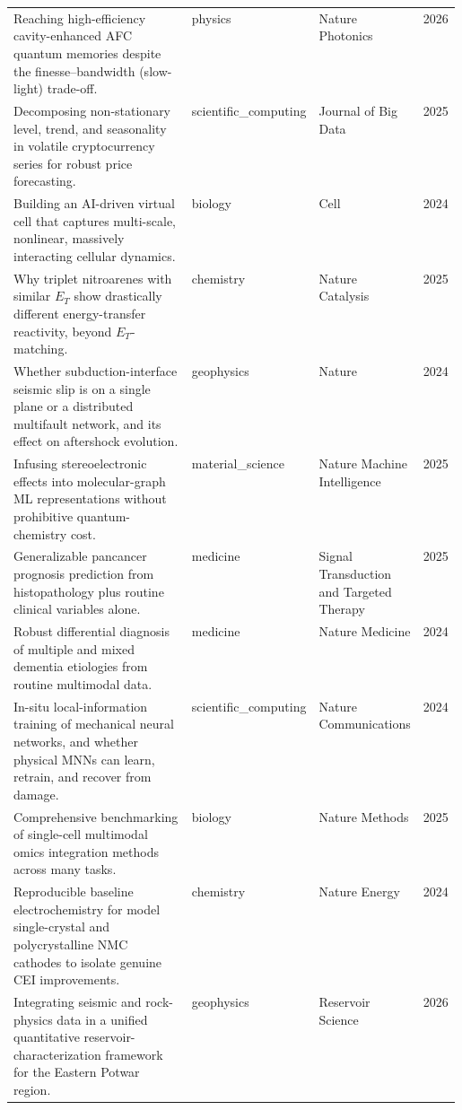 \begin{landscape}
\begin{longtable}{@{}p{0.58\linewidth} l l c@{}}
\addlinespace
Reaching high-efficiency cavity-enhanced AFC quantum memories despite the finesse--bandwidth (slow-light) trade-off. & physics & Nature Photonics & 2026 \\
\addlinespace
Decomposing non-stationary level, trend, and seasonality in volatile cryptocurrency series for robust price forecasting. & scientific\_computing & Journal of Big Data & 2025 \\
\addlinespace
Building an AI-driven virtual cell that captures multi-scale, nonlinear, massively interacting cellular dynamics. & biology & Cell & 2024 \\
\addlinespace
Why triplet nitroarenes with similar $E_T$ show drastically different energy-transfer reactivity, beyond $E_T$-matching. & chemistry & Nature Catalysis & 2025 \\
\addlinespace
Whether subduction-interface seismic slip is on a single plane or a distributed multifault network, and its effect on aftershock evolution. & geophysics & Nature & 2024 \\
\addlinespace
Infusing stereoelectronic effects into molecular-graph ML representations without prohibitive quantum-chemistry cost. & material\_science & Nature Machine Intelligence & 2025 \\
\addlinespace
Generalizable pancancer prognosis prediction from histopathology plus routine clinical variables alone. & medicine & Signal Transduction and Targeted Therapy & 2025 \\
\addlinespace
Robust differential diagnosis of multiple and mixed dementia etiologies from routine multimodal data. & medicine & Nature Medicine & 2024 \\
\addlinespace
In-situ local-information training of mechanical neural networks, and whether physical MNNs can learn, retrain, and recover from damage. & scientific\_computing & Nature Communications & 2024 \\
\addlinespace
Comprehensive benchmarking of single-cell multimodal omics integration methods across many tasks. & biology & Nature Methods & 2025 \\
\addlinespace
Reproducible baseline electrochemistry for model single-crystal and polycrystalline NMC cathodes to isolate genuine CEI improvements. & chemistry & Nature Energy & 2024 \\
\addlinespace
Integrating seismic and rock-physics data in a unified quantitative reservoir-characterization framework for the Eastern Potwar region. & geophysics & Reservoir Science & 2026 \\

\end{longtable}
\end{landscape}
